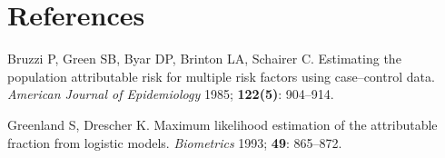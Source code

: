\documentclass{article}      %
\begin{document}
\section{References}

{\parindent=0pt

\smallskip
Bruzzi P, Green SB, Byar DP, Brinton LA, Schairer C.
Estimating the population attributable risk for multiple risk factors using case--control data.
\textsl{American Journal of Epidemiology} 1985; \textbf{122(5)}: 904--914.

\smallskip
Greenland S, Drescher K. Maximum likelihood estimation of the attributable fraction from logistic models.
\textsl{Biometrics} 1993; \textbf{49}: 865--872.

}
\end{document}
